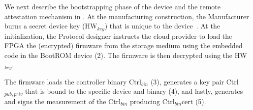 
 We next describe the bootstrapping phase of the device and the remote attestation mechanism in \projecttitle{}. At the manufacturing construction, the Manufacturer burns a secret device key (HW$_{key}$) that is unique to the device~\cite{secure_FPGAs}. At the \projecttitle{} initialization, the Protocol designer instructs the cloud provider to load the FPGA the (encrypted) firmware from the storage medium using the embedded code in the BootROM device (2). The firmware is then decrypted using the HW$_{key}$.  %

The firmware loads the controller binary Ctrl$_{bin}$ (3), generates a key pair Ctrl$_{pub, priv}$ that is bound to the specific device and binary (4), and lastly, generates and signs the measurement of the Ctrl$_{bin}$ producing Ctrl$_{bin}$cert (5). %

